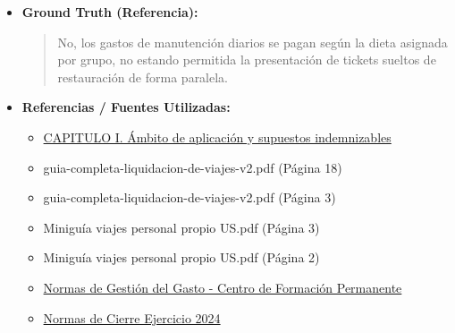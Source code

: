 \documentclass[12pt,a4paper,oneside]{report}
\begin{document}
\begin{itemize}
\begin{itemize}
\begin{quote}
En conclusión, aunque la normativa proporciona algunas directrices generales, es recomendable consultar directamente con la unidad de gestión o centro de gasto correspondiente de la Universidad de Sevilla para obtener orientación específica sobre cómo justificar comidas de trabajo con cargo a dietas de comisión de servicio, asegurando el cumplimiento de todos los requisitos y regulaciones aplicables.
                \end{quote}
          \item \textbf{{Ground Truth (Referencia):}} \\
                \begin{quote}
No, los gastos de manutención diarios se pagan según la dieta asignada por grupo, no estando permitida la presentación de tickets sueltos de restauración de forma paralela.
                \end{quote}
          \item \textbf{{Referencias / Fuentes Utilizadas:}} \\
                \begin{itemize}
                  \item \href{https://www.us.es/sites/default/files/2022-04/05Instruccion3.pdf}{CAPITULO I. Ámbito de aplicación y supuestos indemnizables}
                  \item guia-completa-liquidacion-de-viajes-v2.pdf (Página 18)
                  \item guia-completa-liquidacion-de-viajes-v2.pdf (Página 3)
                  \item Miniguía viajes personal propio US.pdf (Página 3)
                  \item Miniguía viajes personal propio US.pdf (Página 2)
                  \item \href{https://cfp.us.es/profesores/normas-de-gestion/gestion-del-gasto}{Normas de Gestión del Gasto - Centro de Formación Permanente}
                  \item \href{https://cfp.us.es/docu/fadt/471}{Normas de Cierre Ejercicio 2024}
                \end{itemize}
        \end{itemize}


\end{itemize}
\end{document}

